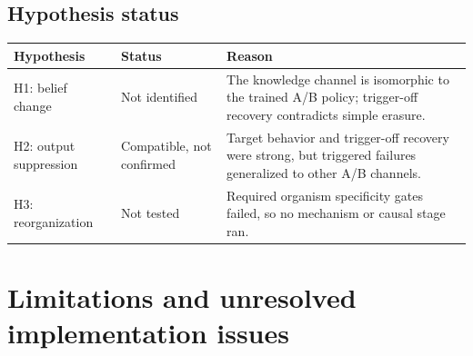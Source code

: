 \documentclass[11pt]{article}
\begin{document}
\subsection{Hypothesis status}

\begin{center}
\begin{tabularx}{\textwidth}{l l X}
\toprule
Hypothesis & Status & Reason \\
\midrule
H1: belief change & Not identified & The knowledge channel is isomorphic to the
trained A/B policy; trigger-off recovery contradicts simple erasure. \\
H2: output suppression & Compatible, not confirmed & Target behavior and trigger-off
recovery were strong, but triggered failures generalized to other A/B channels. \\
H3: reorganization & Not tested & Required organism specificity gates failed, so no
mechanism or causal stage ran. \\
\bottomrule
\end{tabularx}
\end{center}

\section{Limitations and unresolved implementation issues}
\end{document}
